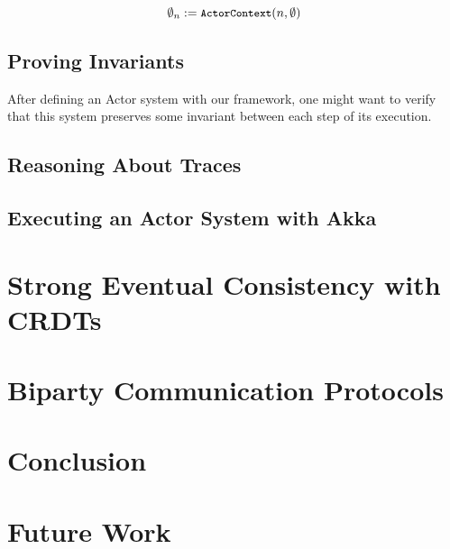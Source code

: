 $$\emptyset_n := \texttt{\small{ActorContext}}(n, \emptyset)$$

\subsection{Proving Invariants}
\label{invariants}

After defining an Actor system with our framework, one might want to verify that this 
system preserves some invariant between each step of its execution.

\subsection{Reasoning About Traces}
\label{traces}


\subsection{Executing an Actor System with Akka}
\label{traces}

\section{Strong Eventual Consistency with CRDTs}
\label{crdt}


\section{Biparty Communication Protocols}
\label{biparty}


\section{Conclusion}
\label{conclusion}


\section{Future Work}
\label{futurework}

\appendix


\clearpage






